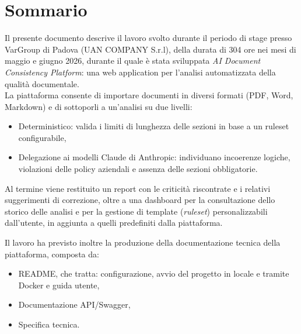 \cleardoublepage
{}
{}
\begingroup
\let\clearpage\relax
\let\cleardoublepage\relax
\let\cleardoublepage\relax

\chapter*{Sommario}

Il presente documento descrive il lavoro svolto durante il periodo di stage presso VarGroup di Padova (UAN COMPANY S.r.l), della durata di 304 ore nei mesi di maggio e giugno 2026, durante il quale è stata sviluppata \textit{AI Document Consistency Platform}: una web application per l'analisi automatizzata della qualità documentale. \\

La piattaforma consente di importare documenti in diversi formati (PDF, Word, Markdown) e di sottoporli a un'analisi su due livelli: 
\begin{itemize}
    \item Deterministico: valida i limiti di lunghezza delle sezioni in base a un ruleset configurabile,
    \item Delegazione ai modelli Claude di Anthropic: individuano incoerenze logiche, violazioni delle policy aziendali e assenza delle sezioni obbligatorie.
\end{itemize}
Al termine viene restituito un report con le criticità riscontrate e i relativi suggerimenti di correzione, oltre a una dashboard per la consultazione dello storico delle analisi e per la gestione di template (\emph{ruleset}) personalizzabili dall'utente, in aggiunta a quelli predefiniti dalla piattaforma.
 
Il lavoro ha previsto inoltre la produzione della documentazione tecnica della piattaforma, composta da:
\begin{itemize}
    \item README, che tratta: configurazione, avvio del progetto in locale e tramite Docker e guida utente,
    \item Documentazione API/Swagger,
    \item Specifica tecnica.
\end{itemize}
 



\endgroup

\vfill
